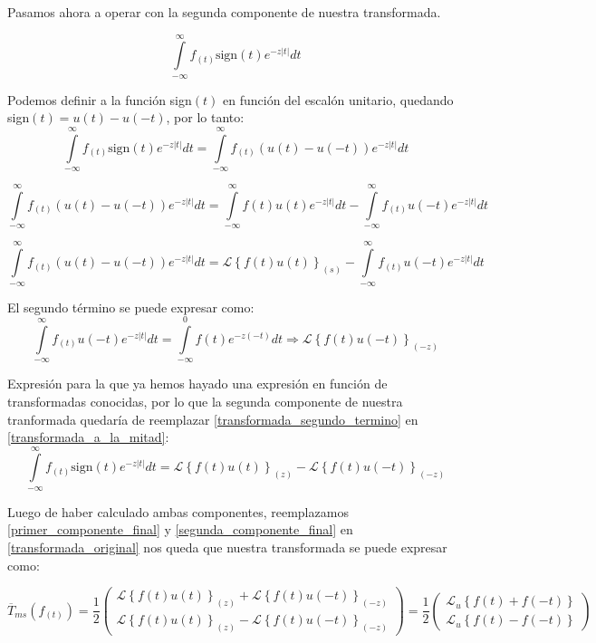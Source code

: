 \documentclass[12pt]{article}
\begin{document}
Pasamos ahora a operar con la segunda componente de nuestra transformada.

$$\int\limits_{-\infty}^{\infty} f_{(t)} \textrm{sign}(t)e^{-z |t|}dt$$

Podemos definir a la función sign$(t)$ en función del escalón unitario, quedando sign$(t) = u(t)-u(-t)$, por lo tanto:
$$\int\limits_{-\infty}^{\infty} f_{(t)} \textrm{sign}(t)e^{-z |t|}dt = \int\limits_{-\infty}^{\infty} f_{(t)} (u(t) -u(-t))e^{-z |t|}dt$$

$$\int\limits_{-\infty}^{\infty} f_{(t)} (u(t) -u(-t))e^{-z |t|}dt =  \int\limits_{-\infty}^{\infty} f(t)u(t) e^{-z |t|}dt - \int\limits_{-\infty}^{\infty} f_{(t)}u(-t) e^{-z |t|}dt$$

\begin{equation}
\int\limits_{-\infty}^{\infty} f_{(t)} (u(t) -u(-t))e^{-z |t|}dt =   \mathcal{L}\left\{f(t)u(t)\right\}_{(s)} - \int\limits_{-\infty}^{\infty} f_{(t)}u(-t) e^{-z |t|}dt
\label{transformada_a_la_mitad}
\end{equation}

El segundo término se puede expresar como:
\begin{equation} \int\limits_{-\infty}^{\infty} f_{(t)}u(-t) e^{-z |t|}dt = \int\limits_{-\infty}^{0} f(t) e^{-z (-t)}dt \Rightarrow  \mathcal{L}\left\{f(t)u(-t)\right\}_{(-z)}
\label{transformada_segundo_termino}
\end{equation}

Expresión para la que ya hemos hayado una expresión en función de transformadas conocidas, por lo que la segunda componente de nuestra tranformada quedaría de reemplazar \ref{transformada_segundo_termino} en \ref{transformada_a_la_mitad}:
 \begin{equation}
 \int\limits_{-\infty}^{\infty} f_{(t)} \textrm{sign}(t)e^{-z |t|}dt =    \mathcal{L}\left\{f(t)u(t)\right\}_{(z)} -  \mathcal{L}\left\{f(t)u(-t)\right\}_{(-z)}
 \label{segunda_componente_final}
 \end{equation}


Luego de haber calculado ambas componentes, reemplazamos \ref{primer_componente_final} y \ref{segunda_componente_final} en \ref{transformada_original} nos queda que nuestra transformada se puede expresar como:

\begin{equation}
\overline{T}_{ms}(f_{(t)}) = \frac12
\begin{pmatrix}
\mathcal{L}\left\{f(t)u(t)\right\}_{(z)} +  \mathcal{L}\left\{f(t)u(-t)\right\}_{(-z)}\\[0.2 cm]
\mathcal{L}\left\{f(t)u(t)\right\}_{(z)} -  \mathcal{L}\left\{f(t)u(-t)\right\}_{(-z)} 
\end{pmatrix} =  \frac12
\begin{pmatrix}
\mathcal{L}_u\left\{f(t) + f(-t)\right\}\\[0.2 cm]
\mathcal{L}_u\left\{f(t) -f(-t)\right\}
\end{pmatrix}
\label{transformada_con_laplace}
\end{equation}
\end{document}
